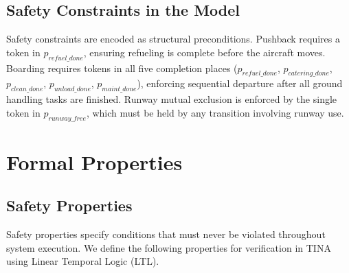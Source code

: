 \documentclass[conference]{IEEEtran}
\begin{document}
\subsection{Safety Constraints in the Model}

Safety constraints are encoded as structural preconditions. Pushback requires a
token in $p_{\mathit{refuel\_done}}$, ensuring refueling is complete before the
aircraft moves. Boarding requires tokens in all five completion places
($p_{\mathit{refuel\_done}}$, $p_{\mathit{catering\_done}}$,
$p_{\mathit{clean\_done}}$, $p_{\mathit{unload\_done}}$,
$p_{\mathit{maint\_done}}$), enforcing sequential departure after all ground
handling tasks are finished. Runway mutual exclusion is enforced by the single
token in $p_{\mathit{runway\_free}}$, which must be held by any transition
involving runway use.


\section{Formal Properties}

\subsection{Safety Properties}

Safety properties specify conditions that must never be violated throughout
system execution. We define the following properties for verification in TINA
using Linear Temporal Logic (LTL).
\end{document}
